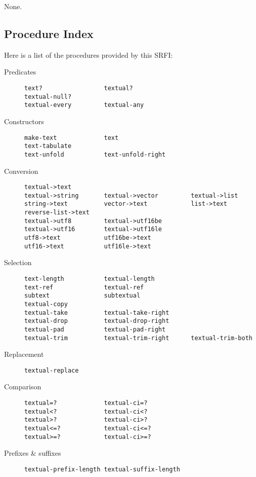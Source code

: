 None.

\subsection{{Procedure Index}}\label{procedure-index}

Here is a list of the procedures provided by this SRFI:

\begin{description}
\item[ Predicates]
\begin{verbatim}
text?                 textual?
textual-null? 
textual-every         textual-any
\end{verbatim}
\item[ Constructors]
\begin{verbatim}
make-text             text
text-tabulate
text-unfold           text-unfold-right
\end{verbatim}
\item[ Conversion]
\begin{verbatim}
textual->text
textual->string       textual->vector         textual->list
string->text          vector->text            list->text
reverse-list->text
textual->utf8         textual->utf16be
textual->utf16        textual->utf16le
utf8->text            utf16be->text
utf16->text           utf16le->text
\end{verbatim}
\item[ Selection]
\begin{verbatim}
text-length           textual-length
text-ref              textual-ref
subtext               subtextual
textual-copy
textual-take          textual-take-right
textual-drop          textual-drop-right
textual-pad           textual-pad-right 
textual-trim          textual-trim-right      textual-trim-both
\end{verbatim}
\item[ Replacement]
\begin{verbatim}
textual-replace
\end{verbatim}
\item[ Comparison]
\begin{verbatim}
textual=?             textual-ci=?
textual<?             textual-ci<?
textual>?             textual-ci>?
textual<=?            textual-ci<=?
textual>=?            textual-ci>=?
\end{verbatim}
\item[Prefixes \& suffixes]
\begin{verbatim}
textual-prefix-length textual-suffix-length

\end{verbatim}
\end{description}
